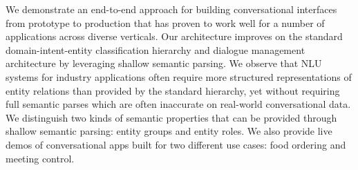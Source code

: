 We demonstrate an end-to-end approach for building conversational interfaces from prototype to production that has proven to work well for a number of applications across diverse verticals. Our architecture improves on the standard domain-intent-entity classification hierarchy and dialogue management architecture by leveraging shallow semantic parsing. We observe that NLU systems for industry applications often require more structured representations of entity relations than provided by the standard hierarchy, yet without requiring full semantic parses which are often inaccurate on real-world conversational data. We distinguish two kinds of semantic properties that can be provided through shallow semantic parsing: entity groups and entity roles. We also provide live demos of conversational apps built for two different use cases: food ordering and meeting control.
